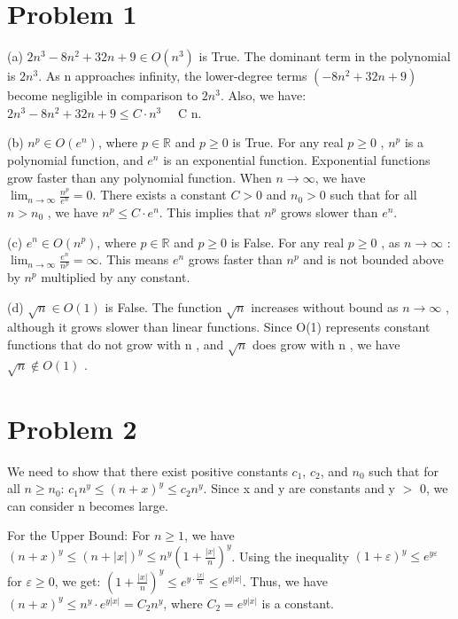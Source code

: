 \documentclass[12 pt]{article}
\begin{document}
\section*{Problem 1}

(a) $2n^3 - 8n^2 + 32n + 9 \in O(n^3)$ is True. The dominant term in the polynomial is $2n^3$. As n approaches infinity, the lower-degree terms $(-8n^2 + 32n + 9)$ become negligible in comparison to $2n^3$. Also, we have: $2n^3 - 8n^2 + 32n + 9 \leq C \cdot n^3 \quad$  C  n.

(b) $n^p \in O(e^n)$, where  $p \in \mathbb{R}$  and  $p \geq 0$ is True. For any real  $p \geq 0$ ,  $n^p$  is a polynomial function, and  $e^n$  is an exponential function. Exponential functions grow faster than any polynomial function. When $n \to \infty$, we have $\lim_{n \to \infty} \frac{n^p}{e^n} = 0$. There exists a constant  $C > 0$  and  $n_0 > 0$  such that for all  $n > n_0$ , we have  $n^p \leq C \cdot e^n$. This implies that  $n^p$  grows slower than  $e^n$.

(c) $e^n \in O(n^p)$, where  $p \in \mathbb{R}$  and  $p \geq 0$ 
is False. For any real  $p \geq 0$ , as  $n \to \infty$ :
$\lim_{n \to \infty} \frac{e^n}{n^p} = \infty$. This means  $e^n$  grows faster than  $n^p$  and is not bounded above by  $n^p$  multiplied by any constant.

(d)  $\sqrt{n} \in O(1)$ is False. The function  $\sqrt{n}$  increases without bound as  $n \to \infty$ , although it grows slower than linear functions. Since  O(1)  represents constant functions that do not grow with  n , and  $\sqrt{n}$  does grow with  n , we have  $\sqrt{n} \notin O(1)$ .

\vspace{1cm}

\section*{Problem 2}
We need to show that there exist positive constants $c_1$, $c_2$, and $n_0$ such that for all $n \geq n_0$: $c_1 n^y \leq (n + x)^y \leq c_2 n^y$. Since x and y are constants and y $>$ 0, we can consider n becomes large.

For the Upper Bound: For $n \geq 1$, we have $(n + x)^y \leq (n + |x|)^y \leq n^y (1 + \frac{|x|}{n})^y$. Using the inequality $(1 + \varepsilon)^y \leq e^{y\varepsilon}$ for $\varepsilon \geq 0$, we get: $(1 + \frac{|x|}{n})^y \leq e^{y \cdot \frac{|x|}{n}} \leq e^{y|x|}$. Thus, we have $(n + x)^y \leq n^y \cdot e^{y|x|} = C_2 n^y$, where $C_2 = e^{y|x|}$ is a constant.
\end{document}
